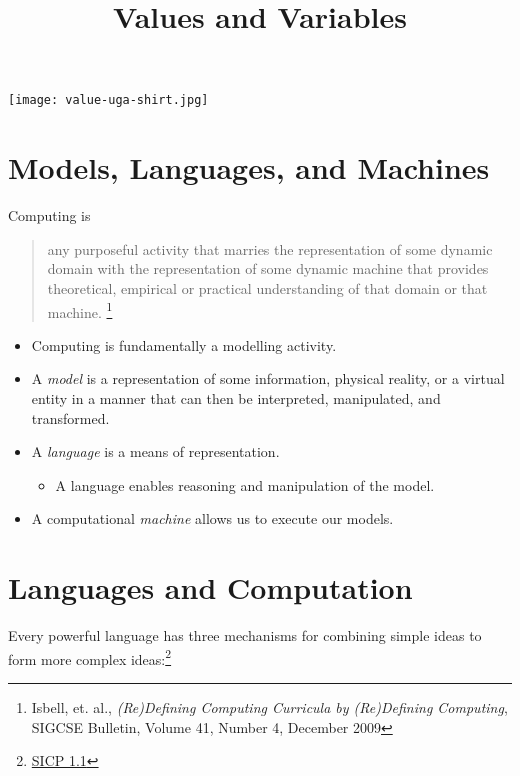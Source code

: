 \documentclass{article}
\title{Values and Variables}
\date{}
\begin{document}
\maketitle

\begin{center}
\texttt{[image: value-uga-shirt.jpg]}
\end{center}


\section{Models, Languages, and Machines}

Computing is

\begin{quote}
any purposeful activity that marries the representation of some dynamic domain with the representation of some dynamic machine that provides theoretical, empirical or practical understanding of that domain or that machine.
\footnote{Isbell, et. al., {\it (Re)Defining Computing Curricula by (Re)Defining Computing}, SIGCSE Bulletin, Volume 41, Number 4, December 2009}
\end{quote}

\begin{itemize}
\item Computing is fundamentally a modelling activity.
\item A {\it model} is a representation of some information, physical reality, or a virtual entity in a manner that can then be interpreted, manipulated, and transformed.
\item A {\it language} is a means of representation.
\begin{itemize}
  \item A language enables reasoning and manipulation of the model.
\end{itemize}
\item A computational {\it machine} allows us to execute our models.
\end{itemize}




\section{Languages and Computation}

Every powerful language has three mechanisms for  combining simple ideas to form more complex ideas:\footnote{\href{http://mitpress.mit.edu/sicp/full-text/book/book-Z-H-10.html}{SICP 1.1}}
\end{document}
